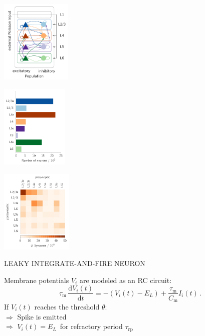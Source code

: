 \documentclass[portrait, final, a0paper, fontscale=0.34, leqno]{baposter}
\begin{document}
\begin{poster}
{    \begin{multicols}{3}
        \includegraphics[height=4.0cm]{diagram} 
        \columnbreak

        \includegraphics[height=4.0cm]{population_size} 
        \columnbreak
        
        \includegraphics[height=4.0cm]{synapse_numbers} 
    \end{multicols} 

    \centerline{\uppercase{Leaky integrate-and-fire neuron}}
    \vspace{0.2cm}
    \begin{vwcol}[widths={0.75, 0.3},
            sep=.4cm, rule=0pt, indent=0em] 
    \setcounter{equation}{0}
    Membrane potentials $V_i$ are modeled as an RC circuit:
        \begin{equation}
            \tau_\text{m} \,\frac{\text{d} V_i(t)}{\text{d} t} 
            = - (V_i(t) - E_L) + \frac{\tau_\text{m}}{C_\text{m}} I_i(t) \,.
            \label{eq:lif-neuron}
        \end{equation}
        If $V_i(t)$ reaches the threshold $\theta$: \\
        \vspace{0.2cm}
            \quad $\Rightarrow$ 
                Spike is emitted \\
        \vspace{0.2cm}
            \quad $\Rightarrow$ 
                $V_i(t) = E_L$ \,for refractory period $\tau_\text{rp}$ 


\end{vwcol}}
\end{poster}
\end{document}

